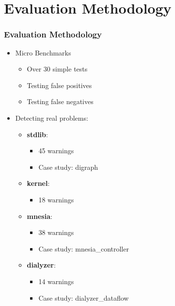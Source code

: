 \section{Evaluation Methodology}
\frametitle{Evaluation Methodology}

\begin{frame}

\begin{itemize}
	\item Micro Benchmarks
	\begin{itemize}
		\item Over 30 simple tests
		\item Testing false positives
		\item Testing false negatives
	\end{itemize}
        \pause
	\item Detecting real problems:
	  \begin{itemize}
          \item \textbf{stdlib}:
            \begin{itemize}
            \item 45 warnings
            \item Case study: digraph
            \end{itemize}
          \item \textbf{kernel}:
            \begin{itemize}
            \item 18 warnings
            \end{itemize}
            \pause
          \item \textbf{mnesia}:
            \begin{itemize}
            \item 38 warnings
            \item Case study: mnesia\_controller
            \end{itemize}
            \pause
          \item \textbf{dialyzer}:
            \begin{itemize}
            \item 14 warnings
            \item Case study: dialyzer\_dataflow
            \end{itemize}
	\end{itemize}
\end{itemize}

\end{frame}
